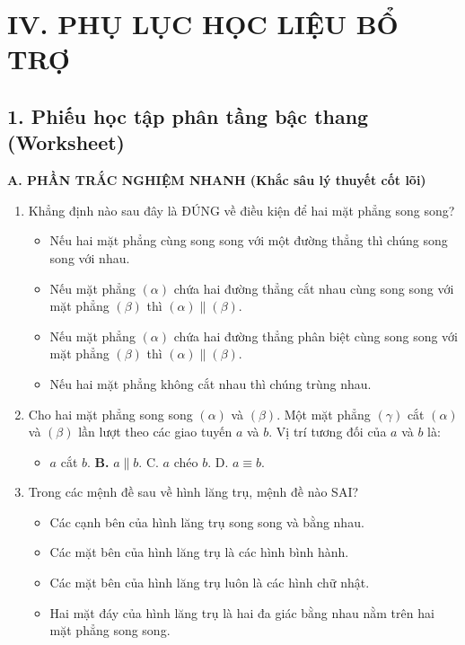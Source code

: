 \documentclass[12pt, a4paper]{article}
\begin{document}
\section*{IV. PHỤ LỤC HỌC LIỆU BỔ TRỢ}

\subsection*{1. Phiếu học tập phân tầng bậc thang (Worksheet)}

\noindent \textbf{A. PHẦN TRẮC NGHIỆM NHANH (Khắc sâu lý thuyết cốt lõi)}
\begin{enumerate}[leftmargin=0.6cm]
    \item Khẳng định nào sau đây là ĐÚNG về điều kiện để hai mặt phẳng song song?
    \begin{itemize}[leftmargin=0.6cm]
        \item[A.] Nếu hai mặt phẳng cùng song song với một đường thẳng thì chúng song song với nhau.
        \item[\textbf{B.}] Nếu mặt phẳng $(\alpha)$ chứa hai đường thẳng cắt nhau cùng song song với mặt phẳng $(\beta)$ thì $(\alpha) \parallel (\beta)$.
        \item[C.] Nếu mặt phẳng $(\alpha)$ chứa hai đường thẳng phân biệt cùng song song với mặt phẳng $(\beta)$ thì $(\alpha) \parallel (\beta)$.
        \item[D.] Nếu hai mặt phẳng không cắt nhau thì chúng trùng nhau.
    \end{itemize}

    \item Cho hai mặt phẳng song song $(\alpha)$ và $(\beta)$. Một mặt phẳng $(\gamma)$ cắt $(\alpha)$ và $(\beta)$ lần lượt theo các giao tuyến $a$ và $b$. Vị trí tương đối của $a$ và $b$ là:
    \begin{itemize}[leftmargin=0.6cm]
        \item[A.] $a$ cắt $b$. \quad \textbf{B.} $a \parallel b$. \quad C. $a$ chéo $b$. \quad D. $a \equiv b$.
    \end{itemize}

    \item Trong các mệnh đề sau về hình lăng trụ, mệnh đề nào SAI?
    \begin{itemize}[leftmargin=0.6cm]
        \item[A.] Các cạnh bên của hình lăng trụ song song và bằng nhau.
        \item[B.] Các mặt bên của hình lăng trụ là các hình bình hành.
        \item[\textbf{C.}] Các mặt bên của hình lăng trụ luôn là các hình chữ nhật.
        \item[D.] Hai mặt đáy của hình lăng trụ là hai đa giác bằng nhau nằm trên hai mặt phẳng song song.
    \end{itemize}


\end{enumerate}
\end{document}
